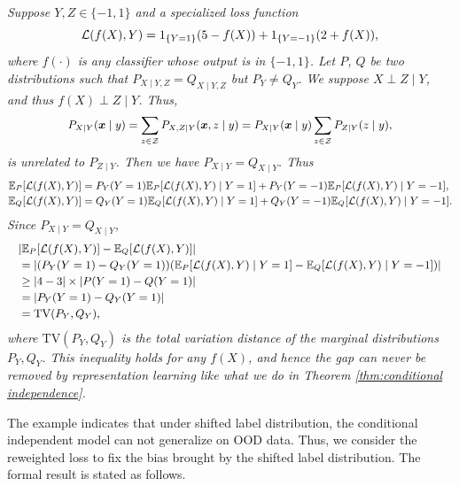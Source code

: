 \begin{example}\label{ex: label shift}\emph{
		Suppose $Y, Z\in \{-1,1\}$ and a specialized loss function 
		\begin{equation}
			\small
			\cL(f(X), Y) = 1_{\{Y = 1\}}(5-f(X)) + 1_{\{Y = -1\}}(2+f(X)), 
		\end{equation}
		where $f(\cdot)$ is any classifier whose output is in $\{-1,1\}$. Let $P$, $Q$ be two distributions such that $P_{X\mid Y,Z} = Q_{X\mid Y,Z}$ but $P_{Y}\neq Q_{Y}$. We suppose $X \perp Z\mid Y$, and thus $f(X)\perp Z\mid Y$. Thus, 
		\begin{equation}
			\small
			P_{X\mid Y}(\bx\mid y) = \sum_{z\in\cZ} P_{X, Z\mid Y}(\bx, z\mid y) = P_{X\mid Y}(\bx\mid y)\sum_{z\in\cZ} P_{Z\mid Y}(z\mid y),
		\end{equation}
		is unrelated to $P_{Z\mid Y}$. Then we have $P_{X\mid Y} = Q_{X\mid Y}$. Thus 
		\begin{equation}
			\small
			\begin{aligned}
				\mE_{P}[\cL(f(X),Y)] &=  P_{Y}(Y=1)\mE_{P}[\cL(f(X),Y)\mid Y=1] + P_{Y}(Y = -1)\mE_{P}[\cL(f(X),Y)\mid Y = -1], \\
				\mE_{Q}[\cL(f(X),Y)] &= Q_{Y}(Y=1)\mE_{Q}[\cL(f(X),Y)\mid Y=1] + Q_{Y}(Y = -1)\mE_{Q}[\cL(f(X),Y)\mid Y = -1].
			\end{aligned}
		\end{equation}
		Since $P_{X\mid Y} = Q_{X\mid Y}$,
		\begin{equation}\label{eq:tv lower bound}
			\small
			\begin{aligned}
				& |\mE_{P}[\cL(f(X),Y)] - \mE_{Q}[\cL(f(X),Y)]| \\
				& = |(P_{Y}(Y=1) - Q_{Y}(Y=1))(\mE_{P}[\cL(f(X),Y)\mid Y=1] - \mE_{Q}[\cL(f(X),Y)\mid Y = -1])|\\
				& \geq |4 - 3| \times |P(Y=1) - Q(Y=1)| \\
				& = |P_{Y}(Y=1) - Q_{Y}(Y=1)| \\
				& = \mathrm{TV}(P_{Y}, Q_{Y}),
			\end{aligned}
		\end{equation}
		where $\mathrm{TV}(P_{Y}, Q_{Y})$ is the total variation distance of the marginal distributions $P_{Y}, Q_{Y}$. This inequality holds for any $f(X)$, and hence the gap can never be removed by representation learning like what we do in Theorem \ref{thm:conditional independence}.}
\end{example}
\par
The example indicates that under shifted label distribution, the conditional independent model can not generalize on OOD data. Thus, we consider the reweighted loss to fix the bias brought by the shifted label distribution. The formal result is stated as follows. 
